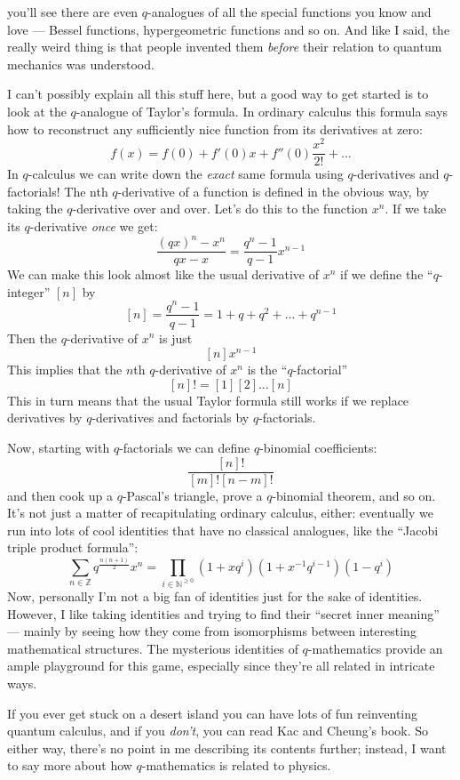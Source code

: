 \documentclass{article}
\begin{document}
you'll see there are even \(q\)-analogues of all the special functions
you know and love --- Bessel functions, hypergeometric functions and so
on. And like I said, the really weird thing is that people invented them
\emph{before} their relation to quantum mechanics was understood.

I can't possibly explain all this stuff here, but a good way to get
started is to look at the \(q\)-analogue of Taylor's formula. In
ordinary calculus this formula says how to reconstruct any sufficiently
nice function from its derivatives at zero:
\[f(x) = f(0) + f'(0) x + f''(0)\frac{x^2}{2!} + \ldots\] In
\(q\)-calculus we can write down the \emph{exact} same formula using
\(q\)-derivatives and \(q\)-factorials! The nth \(q\)-derivative of a
function is defined in the obvious way, by taking the \(q\)-derivative
over and over. Let's do this to the function \(x^n\). If we take its
\(q\)-derivative \emph{once} we get:
\[\frac{(qx)^n-x^n}{qx-x} = \frac{q^n-1}{q-1}x^{n-1}\] We can make this
look almost like the usual derivative of \(x^n\) if we define the
``\(q\)-integer'' \([n]\) by
\[[n] = \frac{q^n-1}{q-1} = 1+q+q^2+\ldots+q^{n-1}\] Then the
\(q\)-derivative of \(x^n\) is just \[[n] x^{n-1}\] This implies that
the \(n\)th \(q\)-derivative of \(x^n\) is the ``\(q\)-factorial''
\[[n]! = [1] [2] \ldots [n] \] This in turn means that the usual Taylor
formula still works if we replace derivatives by \(q\)-derivatives and
factorials by \(q\)-factorials.

Now, starting with \(q\)-factorials we can define \(q\)-binomial
coefficients: \[\frac{[n]!}{[m]![n-m]!}\] and then cook up a
\(q\)-Pascal's triangle, prove a \(q\)-binomial theorem, and so on. It's
not just a matter of recapitulating ordinary calculus, either:
eventually we run into lots of cool identities that have no classical
analogues, like the ``Jacobi triple product formula'':
\[\sum_{n\in\mathbb{Z}} q^{\frac{n(n+1)}{2}}x^n = \prod_{i\in\mathbb{N}^{\geqslant0}} (1+xq^i)(1+x^{-1}q^{i-1})(1-q^i)\]
Now, personally I'm not a big fan of identities just for the sake of
identities. However, I like taking identities and trying to find their
``secret inner meaning'' --- mainly by seeing how they come from
isomorphisms between interesting mathematical structures. The mysterious
identities of \(q\)-mathematics provide an ample playground for this
game, especially since they're all related in intricate ways.

If you ever get stuck on a desert island you can have lots of fun
reinventing quantum calculus, and if you \emph{don't}, you can read Kac
and Cheung's book. So either way, there's no point in me describing its
contents further; instead, I want to say more about how
\(q\)-mathematics is related to physics.
\end{document}
